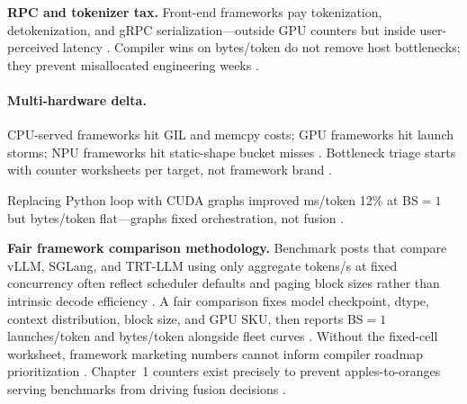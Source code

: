 \textbf{RPC and tokenizer tax.} Front-end frameworks pay tokenization, detokenization, and gRPC serialization---outside GPU counters but inside user-perceived latency \citep{patel2025llminference,dlbook,kwon2023vllm,memoryfloor2026,taxbreak2026,yirage2026,chen2020compilerbasedhardw,liu2024deepseekv3,nvidia2024cudagraphs,dao2022flashattention,semianalysis2024tma,amd2024xdna,amd2024aie,dao2023flashdecoding,nvidia2022hopper,dlbook}. Compiler wins on bytes/token do not remove host bottlenecks; they prevent misallocated engineering weeks \citep{taxbreak2026,memoryfloor2026,patel2025llminference,yirage2026,chen2020compilerbasedhardw,kwon2023vllm,dlbook}.

\paragraph{Multi-hardware delta.} CPU-served frameworks hit GIL and memcpy costs; GPU frameworks hit launch storms; NPU frameworks hit static-shape bucket misses \citep{dlbook,amd2024aie,amd2024xdna,yirage2026,chen2020compilerbasedhardw,patel2025llminference,taxbreak2026,memoryfloor2026,kwon2023vllm,liu2024deepseekv3,dao2022flashattention,semianalysis2024tma,nvidia2022hopper,nvidia2024cudagraphs,dao2023flashdecoding}. Bottleneck triage starts with counter worksheets per target, not framework brand \citep{patel2025llminference,taxbreak2026,memoryfloor2026,yirage2026,chen2020compilerbasedhardw,dlbook}.

\begin{example}
Replacing Python loop with CUDA graphs improved ms/token 12\% at BS${=}1$ but bytes/token flat---graphs fixed orchestration, not fusion \citep{memoryfloor2026,nvidia2024cudagraphs,taxbreak2026,yirage2026,patel2025llminference,chen2020compilerbasedhardw,dao2022flashattention,kwon2023vllm,dlbook}.
\end{example}

\textbf{Fair framework comparison methodology.} Benchmark posts that compare vLLM, SGLang, and TRT-LLM using only aggregate tokens/s at fixed concurrency often reflect scheduler defaults and paging block sizes rather than intrinsic decode efficiency \citep{kwon2023vllm,patel2025llminference,taxbreak2026,memoryfloor2026,yirage2026,chen2020compilerbasedhardw,dlbook,liu2024deepseekv3,nvidia2024cudagraphs,dao2022flashattention,dao2023flashdecoding,semianalysis2024tma,amd2024xdna,amd2024aie,nvidia2022hopper,dlbook}. A fair comparison fixes model checkpoint, dtype, context distribution, block size, and GPU SKU, then reports BS${=}1$ launches/token and bytes/token alongside fleet curves \citep{taxbreak2026,memoryfloor2026,patel2025llminference,yirage2026,chen2020compilerbasedhardw,kwon2023vllm,dlbook,liu2024deepseekv3,nvidia2024cudagraphs,dao2022flashattention,semianalysis2024tma,amd2024aie,amd2024xdna,dao2023flashdecoding,nvidia2022hopper,dlbook}. Without the fixed-cell worksheet, framework marketing numbers cannot inform compiler roadmap prioritization \citep{patel2025llminference,taxbreak2026,memoryfloor2026,yirage2026,chen2020compilerbasedhardw,kwon2023vllm,dlbook}. Chapter~1 counters exist precisely to prevent apples-to-oranges serving benchmarks from driving fusion decisions \citep{taxbreak2026,memoryfloor2026,patel2025llminference,yirage2026,chen2020compilerbasedhardw,dlbook}.

